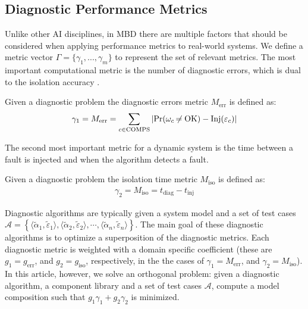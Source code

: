 \subsection{Diagnostic Performance Metrics}
%
Unlike other AI disciplines, in MBD there are multiple factors that
should be considered when applying performance metrics to real-world
systems. 
We define a metric vector $\Gamma = \{\gamma_1,...,\gamma_m\}$ to 
represent the set of relevant metrics.
The most important computational metric is the number of
diagnostic errors, which is dual to the isolation accuracy
\citep{feldman10empirical}.
%
\begin{definition}
%
Given a diagnostic problem \dproblem the diagnostic errors metric
$M_{\mathrm{err}}$ is defined as:
%
\begin{eqnarray}
%
\gamma_1 = M_{\mathrm{err}} = \sum_{c \in \comps}{\left|\pr(\omega_c \ne \ok) - \inj(\varepsilon_c)\right|}
%
\end{eqnarray}
%
\end{definition}
%
The second most important metric for a dynamic system is the time
between a fault is injected and when the algorithm detects a fault.
%
\begin{definition}
%
Given a diagnostic problem \dproblem the isolation time metric
$M_{\mathrm{iso}}$ is defined as:
%
\begin{eqnarray}
%
\gamma_2 = M_{\mathrm{iso}} = t_{\mathrm{diag}} - t_{\mathrm{inj}}
%
\end{eqnarray}
%
\end{definition}
%
Diagnostic algorithms are typically given a system model \sd and a set
of test cases $\mathcal{A} = \left\{\langle\tilde\alpha_1,
\tilde\varepsilon_1\rangle, \langle\tilde\alpha_2,
\tilde\varepsilon_2\rangle, \cdots, \langle\tilde\alpha_n,
\tilde\varepsilon_n\rangle\right\}$. The main goal of these diagnostic
algorithms is to optimize a superposition of the diagnostic
metrics. Each diagnostic metric is weighted with a domain specific
coefficient (these are $g_1=g_{\mathrm{err}}$, and $g_2=g_{\mathrm{iso}}$,
respectively, in the the cases of $\gamma_1=M_{\mathrm{err}}$, and
$\gamma_2=M_{\mathrm{iso}}$). In this article, however, we solve an orthogonal
problem: given a diagnostic algorithm, a component library and a set
of test cases $\mathcal{A}$, compute a model composition \sd such that
$g_{1} \gamma_1 + g_{2} \gamma_2$
is minimized.
